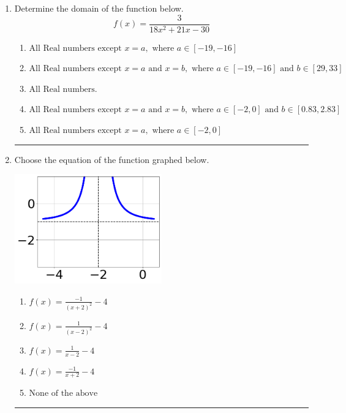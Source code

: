 \documentclass[14pt]{extbook}
\newcommand{\litem}[1]{\item#1\hspace*{-1cm}\rule{\textwidth}{0.4pt}}
\begin{document}
\begin{enumerate}
{\begin{enumerate}[label=\Alph*.]
\end{enumerate} }
\litem{
Determine the domain of the function below.\[ f(x) = \frac{3}{18x^{2} +21 x -30} \]\begin{enumerate}[label=\Alph*.]
\item \( \text{All Real numbers except } x = a, \text{ where } a \in [-19, -16] \)
\item \( \text{All Real numbers except } x = a \text{ and } x = b, \text{ where } a \in [-19, -16] \text{ and } b \in [29, 33] \)
\item \( \text{All Real numbers.} \)
\item \( \text{All Real numbers except } x = a \text{ and } x = b, \text{ where } a \in [-2, 0] \text{ and } b \in [0.83, 2.83] \)
\item \( \text{All Real numbers except } x = a, \text{ where } a \in [-2, 0] \)

\end{enumerate} }
\litem{
Choose the equation of the function graphed below.
\begin{center}
    \includegraphics[width=0.5\textwidth]{../Figures/rationalGraphToEquationCopyB.png}
\end{center}
\begin{enumerate}[label=\Alph*.]
\item \( f(x) = \frac{-1}{(x + 2)^2} - 4 \)
\item \( f(x) = \frac{1}{(x - 2)^2} - 4 \)
\item \( f(x) = \frac{1}{x - 2} - 4 \)
\item \( f(x) = \frac{-1}{x + 2} - 4 \)
\item \( \text{None of the above} \)


\end{enumerate}}
\end{enumerate}
\end{document}
